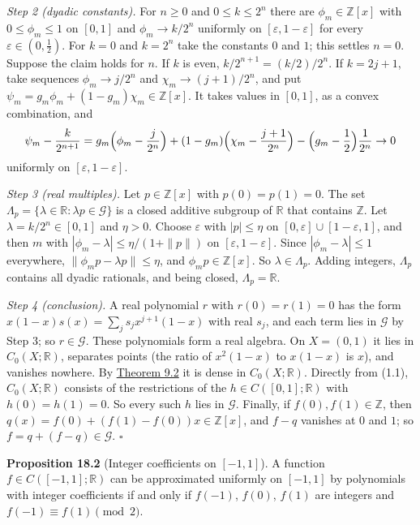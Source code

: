 \documentclass[
  english,
  11pt,
  a4paper,
]{article}
\begin{document}
\emph{Step 2 (dyadic constants).} For \(n\geq0\) and \(0\leq k\leq2^n\)
there are \(\phi_m\in\mathbb Z[x]\) with \(0\leq\phi_m\leq1\) on
\([0,1]\) and \(\phi_m\to k/2^n\) uniformly on
\([\varepsilon,1-\varepsilon]\) for every \(\varepsilon\in(0,\frac12)\).
For \(k=0\) and \(k=2^n\) take the constants \(0\) and \(1\); this
settles \(n=0\). Suppose the claim holds for \(n\). If \(k\) is even,
\(k/2^{n+1}=(k/2)/2^n\). If \(k=2j+1\), take sequences
\(\phi_m\to j/2^n\) and \(\chi_m\to(j+1)/2^n\), and put
\(\psi_m=g_m\phi_m+(1-g_m)\chi_m\in\mathbb Z[x]\). It takes values in
\([0,1]\), as a convex combination, and
\[\psi_m-\frac{k}{2^{n+1}}=g_m\Bigl(\phi_m-\frac j{2^n}\Bigr)+(1-g_m)\Bigl(\chi_m-\frac{j+1}{2^n}\Bigr)-\Bigl(g_m-\frac12\Bigr)\frac1{2^n}\to0\]
uniformly on \([\varepsilon,1-\varepsilon]\).

\emph{Step 3 (real multiples).} Let \(p\in\mathbb Z[x]\) with
\(p(0)=p(1)=0\). The set
\(\Lambda_p=\{\lambda\in\mathbb R:\lambda p\in\mathcal G\}\) is a closed
additive subgroup of \(\mathbb R\) that contains \(\mathbb Z\). Let
\(\lambda=k/2^n\in[0,1]\) and \(\eta>0\). Choose \(\varepsilon\) with
\(|p|\leq\eta\) on \([0,\varepsilon]\cup[1-\varepsilon,1]\), and then
\(m\) with \(|\phi_m-\lambda|\leq\eta/(1+\|p\|)\) on
\([\varepsilon,1-\varepsilon]\). Since \(|\phi_m-\lambda|\leq1\)
everywhere, \(\|\phi_mp-\lambda p\|\leq\eta\), and
\(\phi_mp\in\mathbb Z[x]\). So \(\lambda\in\Lambda_p\). Adding integers,
\(\Lambda_p\) contains all dyadic rationals, and being closed,
\(\Lambda_p=\mathbb R\).

\emph{Step 4 (conclusion).} A real polynomial \(r\) with \(r(0)=r(1)=0\)
has the form \(x(1-x)s(x)=\sum_js_jx^{j+1}(1-x)\) with real \(s_j\), and
each term lies in \(\mathcal G\) by Step 3; so \(r\in\mathcal G\). These
polynomials form a real algebra. On \(X=(0,1)\) it lies in
\(C_0(X;\mathbb R)\), separates points (the ratio of \(x^2(1-x)\) to
\(x(1-x)\) is \(x\)), and vanishes nowhere. By
\hyperlink{the-stone-weierstrass-theorem-for-functions-vanishing-at-infinity--oa-fnd-sw-08}{Theorem
9.2} it is dense in \(C_0(X;\mathbb R)\). Directly from (1.1),
\(C_0(X;\mathbb R)\) consists of the restrictions of the
\(h\in C([0,1];\mathbb R)\) with \(h(0)=h(1)=0\). So every such \(h\)
lies in \(\mathcal G\). Finally, if \(f(0),f(1)\in\mathbb Z\), then
\(q(x)=f(0)+(f(1)-f(0))x\in\mathbb Z[x]\), and \(f-q\) vanishes at \(0\)
and \(1\); so \(f=q+(f-q)\in\mathcal G\). \(\square\)

\textbf{Proposition 18.2} (Integer coefficients on \([-1,1]\)). A
function \(f\in C([-1,1];\mathbb R)\) can be approximated uniformly on
\([-1,1]\) by polynomials with integer coefficients if and only if
\(f(-1)\), \(f(0)\), \(f(1)\) are integers and
\(f(-1)\equiv f(1)\pmod 2\).
\end{document}
